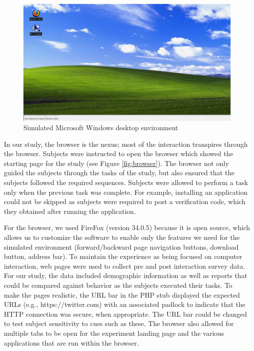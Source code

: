 \begin{figure}[tpb]
  \centering
\includegraphics[width=\columnwidth]{img/desktop.png}
  \caption{Simulated Microsoft Windows desktop environment}
  \label{fig:desktop}
\end{figure}

In our study, the browser is the nexus; most of the interaction transpires through the browser. Subjects were instructed to open the browser which showed the starting page for the study (see
Figure \ref{fig:browser}). The browser not only guided the subjects through the tasks of the study, but also ensured that the subjects followed the required sequences. Subjects were allowed to perform a task only when the previous task was complete. For example, installing an application could not be skipped as subjects were required to post a verification code, which they obtained after running the application.

For the browser, we used FireFox (version 34.0.5) because it is open source, which allows us to customize the software to enable only the features we need for the simulated environment (forward/backward page navigation buttons, download button, address bar). To maintain the experience as being focused on computer interaction, web pages were used to collect pre and post interaction survey data. For our study, the data included demographic information as well as reports that could be compared against behavior as the subjects executed their tasks. To make the pages realistic, the URL bar in the PHP stub displayed the expected URLs (e.g., https://twitter.com) with an associated padlock to indicate that the HTTP connection was secure, when appropriate. The URL bar could be changed to test subject sensitivity to cues such as these. The browser also allowed for multiple tabs to be open for the experiment landing page and the various applications that are run within the browser.

